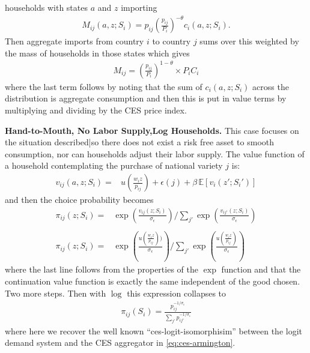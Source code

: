 \documentclass[12pt,pdftex]{article}
\begin{document}
\begin{onehalfspacing}
households with states $a$ and $z$ importing
\begin{align}
M_{ij}(a, z; S_i) = p_{ij} \left(\frac{p_{ij}}{P_i}\right)^{-\theta} c_{i}(a,z; S_i).
\end{align}
Then aggregate imports from country $i$ to country $j$ sums over this weighted by the mass of households in those states which gives
\begin{align}
M_{ij} =  \left(\frac{p_{ij}}{P_i}\right)^{1-\theta} \times P_{i} C_{i}
\end{align}
where the last term follows by noting that the sum of $c_{i}(a,z; S_i)$ across the distribution is aggregate consumption and then this is put in value terms by multiplying and dividing by the CES price index.

\textbf{Hand-to-Mouth, No Labor Supply,Log Households.} This case focuses on the situation described|so there does not exist a risk free asset to smooth consumption, nor can households adjust their labor supply. The value function of a household contemplating the purchase of national variety $j$ is:
\begin{align}
v_{ij}(a, z;  S_i  ) = &   u\left( \frac{w_{i}z}{p_{ij}} \right) + \epsilon(j)  + \beta \, \mathbb{E} [v_{i}(z'; S_i' )]
\end{align}
and then the choice probability becomes
\begin{align}
\pi_{ij}(z; S_i) = & \exp \left( \frac{ v_{ij}(z;  S_i ) }{\sigma_{\epsilon}} \right) \Bigg / \sum_{j'} \exp \left( \frac{ v_{ij'}(z;  S_i ) }{\sigma_{\epsilon}} \right) \\
\nonumber\\
\pi_{ij}(z; S_i) = & \exp \left( \frac{ u\left( \frac{w_{i}z}{p_{ij}} \right) ) }{\sigma_{\epsilon}} \right) \Bigg / \sum_{j'} \exp \left( \frac{ u\left( \frac{w_{i}z}{p_{ij}} \right) }{\sigma_{\epsilon}} \right)
\end{align}
where the last line follows from the properties of the $\exp$ function and that the continuation value function is exactly the same independent of the good chosen. Two more steps. Then with $\log$ this expression collapses to
\begin{align}
\pi_{ij}(S_i) = \frac{p_{ij}^{-1 / \sigma_{\epsilon}}}{\sum_{j'} p_{ij'}^{-1 / \sigma_{\epsilon}}}
\end{align}
where here we recover the well known ``ces-logit-isomorphisim'' between the logit demand system and the CES aggregator in \ref{eq:ces-armington}.


\end{onehalfspacing}
\end{document}

